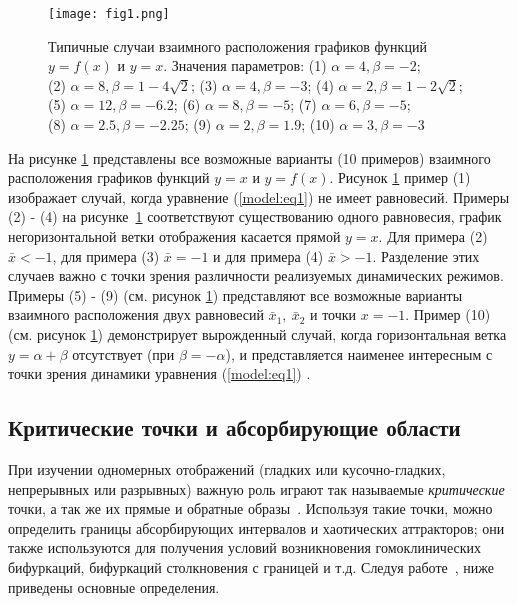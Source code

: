 \documentclass[a4paper, 14pt]{extreport}
\numberwithin{equation}{section}
\numberwithin{figure}{section}
\numberwithin{table}{section}
\begin{document}
		\begin{figure}[h!]
			\begin{center}
				\texttt{[image: fig1.png]}
			\end{center}
			\caption{Типичные случаи взаимного расположения графиков функций $ y = f(x) $ и $ y = x $. Значения параметров: (1) $ \alpha = 4, \beta = -2 $; \\(2) $ \alpha = 8, \beta = 1 - 4 \sqrt{2} $; (3) $ \alpha = 4, \beta = -3 $; (4) $ \alpha = 2, \beta = 1 - 2 \sqrt{2} $; \\(5) $ \alpha = 12, \beta = -6.2 $; (6) $ \alpha = 8, \beta = -5 $; (7) $ \alpha = 6, \beta = -5 $; \\ (8) $ \alpha = 2.5, \beta = -2.25 $; (9) $ \alpha = 2, \beta = 1.9 $; (10) $ \alpha = 3, \beta = -3 $ }
			\label{fig1}		
		\end{figure}
		На рисунке \ref{fig1} представлены все возможные варианты (10 примеров) взаимного расположения графиков функций $ y = x $ и $ y = f(x) $. Рисунок \ref{fig1} пример (1) изображает случай, когда уравнение (\ref{model:eq1}) не имеет равновесий. Примеры (2) - (4) на рисунке~\ref{fig1} соответствуют существованию одного равновесия, график негоризонтальной ветки отображения касается прямой $ y = x $. Для примера (2) $ \bar{x} < -1 $, для примера (3) $ \bar{x} = -1 $ и для примера (4) $ \bar{x} > -1 $. Разделение этих случаев важно с точки зрения различности реализуемых динамических режимов. Примеры (5) - (9) (см. рисунок \ref{fig1}) представляют все возможные варианты взаимного расположения двух равновесий $ \bar{x}_{1},~\bar{x}_{2} $ и точки $ x = -1 $. Пример (10) (см. рисунок \ref{fig1}) демонстрирует вырожденный случай, когда горизонтальная ветка $ y = \alpha + \beta $ отсутствует (при $ \beta = - \alpha $), и представляется наименее интересным с точки зрения динамики уравнения (\ref{model:eq1}) . %
		
	\subsection{Критические точки и абсорбирующие области}
	\label{critical_p_absorbing_i}
		При изучении одномерных отображений (гладких или кусочно-гладких, непрерывных или разрывных) важную роль играют так называемые {\it критические} точки, а так же их прямые и обратные образы~\cite{SushkoGardiniAvrutin2016}. Используя такие точки, можно определить границы абсорбирующих интервалов и хаотических аттракторов; они также используются для получения условий возникновения гомоклинических бифуркаций, бифуркаций столкновения с границей и т.д. Следуя работе~\cite{SushkoGardiniAvrutin2016}, ниже приведены основные определения.%
		
\end{document}
